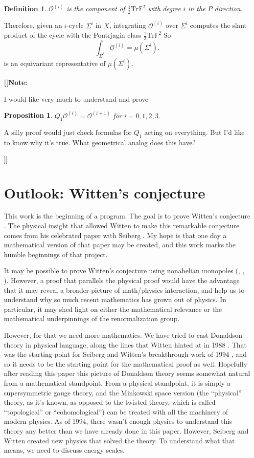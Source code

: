 \documentclass[twoside]{amsart}
\newcommand{\FF}{\ensuremath{\mathbb{F}}}
\newtheorem{definition}{Definition}
\newtheorem{prop}{Proposition}
\newcommand{\gc}[1]{{\bf [[Note: {#1}]]}}
\newcommand{\enm}[1]{\ensuremath{#1}}
\newcommand{\oi}[1]{\enm{\mathcal{O}^{(#1)}}}
\begin{document}
{\begin{definition}
    \oi{i} is the component of \( \frac{1}{2}\mathrm{Tr}\FF^{2} \)
    with degree \( i \) in the \( P \) direction.
\end{definition}

Therefore, given an \( i \)-cycle \( \Sigma^{i} \) in \( X \),
integrating \oi{i} over \( \Sigma^{i} \) computes the slant product of
the cycle with the Pontrjagin class \( \frac{1}{2}\mathrm{Tr}\FF^{2}
\) So
\[ \int_{\Sigma^i}\oi{i} = \mu(\Sigma^i).\]
is an equivariant representative of \( \mu(\Sigma^i) \).

\gc{I would like very much to understand and prove
\begin{prop}
    \label{prop:konoi}
    \( Q_{1}\oi{i} = \oi{i+1} \) for \( i=0, 1, 2, 3 \).
\end{prop}
A silly proof would just check formulas for \( Q_{1} \) acting on
everything.  But I'd like to know why it's true.  What geometrical
analog does this have?}
} %
\section{Outlook: Witten's conjecture}
%
This work is the beginning of a program.  The goal is to prove
Witten's conjecture \cite{witten94}.  The physical insight that
allowed Witten to make this remarkable conjecture comes from his
celebrated paper with Seiberg \cite{seibergwitten1}.  My hope is that
one day a mathematical version of that paper may be created, and this
work marks the humble beginnings of that project.

It may be possible to prove Witten's conjecture using nonabelian
monopoles (\cite{pidstrigatchtyurin}, \cite{feehanleness},
\cite{feehanleness2}).  However, a proof that parallels the physical
proof would have the advantage that it may reveal a broader picture of
math/physics interaction, and help us to understand why so much recent
mathematics has grown out of physics.  In particular, it may shed
light on either the mathematical relevance or the mathematical
underpinnings of the renormalization group.

However, for that we need more mathematics.  We have tried to cast
Donaldson theory in physical language, along the lines that Witten
hinted at in 1988 \cite{wittentqft}.  That was the starting point for
Seiberg and Witten's breakthrough work of 1994 \cite{seibergwitten1},
and so it needs to be the starting point for the mathematical proof as
well.  Hopefully after reading this paper this picture of Donaldson
theory seems somewhat natural from a mathematical standpoint.  From a
physical standpoint, it is simply a supersymmetric gauge theory, and
the Minkowski space version (the ``physical'' theory, as it's known,
as opposed to the twisted theory, which is called ``topological'' or
``cohomological'') can be treated with all the machinery of modern
physics.  As of 1994, there wasn't enough physics to understand this
theory any better than we have already done in this paper.  However,
Seiberg and Witten created new physics that solved the theory.  To
understand what that means, we need to discuss energy scales.
\end{document}
